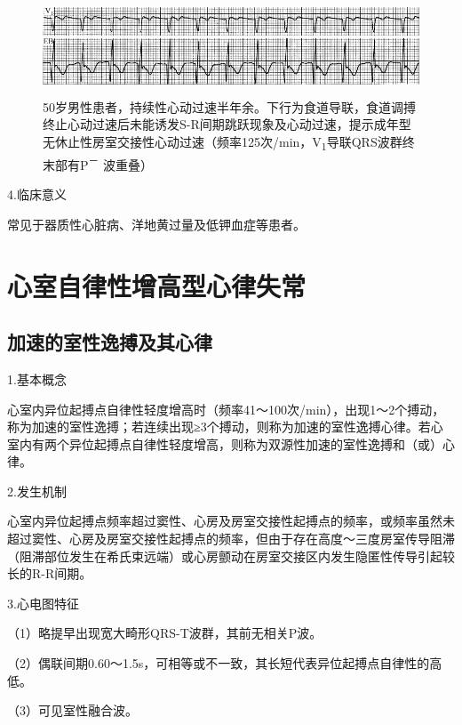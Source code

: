 \begin{figure}[!htbp]
 \centering
 \includegraphics[width=5.58333in,height=1.13542in]{./images/Image00273.jpg}
 \captionsetup{justification=centering}
 \caption{50岁男性患者，持续性心动过速半年余。下行为食道导联，食道调搏终止心动过速后未能诱发S-R间期跳跃现象及心动过速，提示成年型无休止性房室交接性心动过速（频率125次/min，V\textsubscript{1}导联QRS波群终末部有P\textsuperscript{－} 波重叠）}
 \label{fig15-7}
  \end{figure} 


4.临床意义

常见于器质性心脏病、洋地黄过量及低钾血症等患者。

\protect\hypertarget{text00022.htmlux5cux23subid270}{}{}

\section{心室自律性增高型心律失常}

\protect\hypertarget{text00022.htmlux5cux23subid271}{}{}

\subsection{加速的室性逸搏及其心律}

1.基本概念

心室内异位起搏点自律性轻度增高时（频率41～100次/min），出现1～2个搏动，称为加速的室性逸搏；若连续出现≥3个搏动，则称为加速的室性逸搏心律。若心室内有两个异位起搏点自律性轻度增高，则称为双源性加速的室性逸搏和（或）心律。

2.发生机制

心室内异位起搏点频率超过窦性、心房及房室交接性起搏点的频率，或频率虽然未超过窦性、心房及房室交接性起搏点的频率，但由于存在高度～三度房室传导阻滞（阻滞部位发生在希氏束远端）或心房颤动在房室交接区内发生隐匿性传导引起较长的R-R间期。

3.心电图特征

（1）略提早出现宽大畸形QRS-T波群，其前无相关P波。

（2）偶联间期0.60～1.5s，可相等或不一致，其长短代表异位起搏点自律性的高低。

（3）可见室性融合波。

